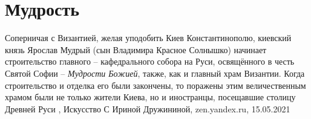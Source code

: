  
 
 
 
 
\chapter{Мудрость}

Соперничая с Византией, желая уподобить Киев Константинополю, киевский князь
Ярослав Мудрый (сын Владимира Красное Солнышко) начинает строительство главного
– кафедрального собора на Руси, освящённого в честь Святой Софии – \emph{Мудрости
Божией}, также, как и главный храм Византии.  Когда строительство и отделка его
были закончены, то поражены этим величественным храмом были не только жители
Киева, но и иностранцы, посещавшие столицу Древней Руси
, 
Искусство С Ириной Дружининой, zen.yandex.ru, 15.05.2021

